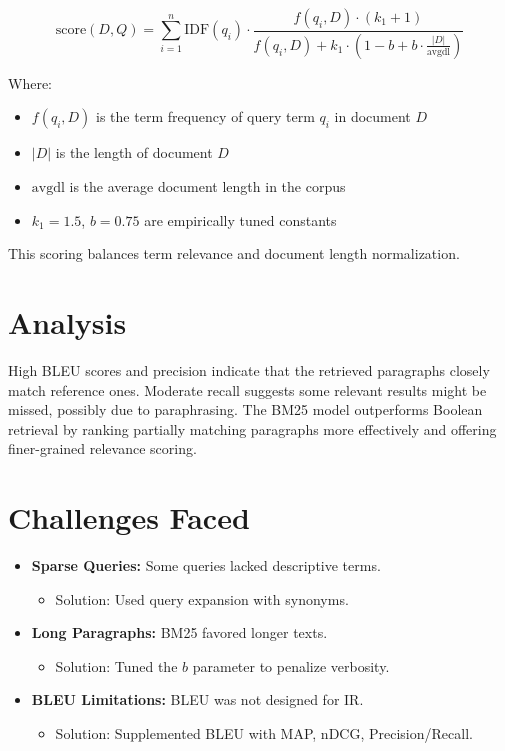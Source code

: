 \documentclass[12pt]{article}
\begin{document}
\[
\text{score}(D, Q) = \sum_{i=1}^{n} \text{IDF}(q_i) \cdot \frac{f(q_i, D) \cdot (k_1 + 1)}{f(q_i, D) + k_1 \cdot (1 - b + b \cdot \frac{|D|}{\text{avgdl}})}
\]

Where:
\begin{itemize}[noitemsep]
    \item \( f(q_i, D) \) is the term frequency of query term \( q_i \) in document \( D \)
    \item \( |D| \) is the length of document \( D \)
    \item \( \text{avgdl} \) is the average document length in the corpus
    \item \( k_1 = 1.5 \), \( b = 0.75 \) are empirically tuned constants
\end{itemize}

This scoring balances term relevance and document length normalization.

\section{Analysis}

High BLEU scores and precision indicate that the retrieved paragraphs closely match reference ones. Moderate recall suggests some relevant results might be missed, possibly due to paraphrasing. The BM25 model outperforms Boolean retrieval by ranking partially matching paragraphs more effectively and offering finer-grained relevance scoring.

\section{Challenges Faced}

\begin{itemize}[noitemsep]
    \item \textbf{Sparse Queries:} Some queries lacked descriptive terms.
    \begin{itemize}[noitemsep]
        \item Solution: Used query expansion with synonyms.
    \end{itemize}
    \item \textbf{Long Paragraphs:} BM25 favored longer texts.
    \begin{itemize}[noitemsep]
        \item Solution: Tuned the \( b \) parameter to penalize verbosity.
    \end{itemize}
    \item \textbf{BLEU Limitations:} BLEU was not designed for IR.
    \begin{itemize}[noitemsep]
        \item Solution: Supplemented BLEU with MAP, nDCG, Precision/Recall.
    \end{itemize}
\end{itemize}
\end{document}
